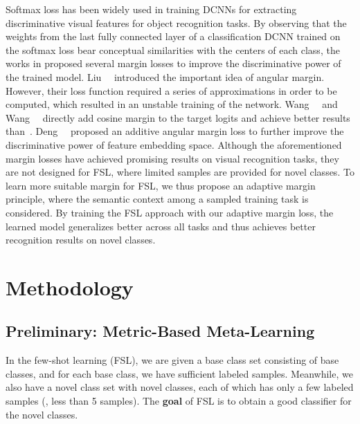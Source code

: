 \documentclass[10pt,twocolumn,letterpaper]{article}
\begin{document}
Softmax loss has been widely used in training DCNNs for extracting discriminative visual features for object recognition tasks. By observing that the weights from the last fully connected layer of a classification DCNN trained on the softmax loss bear conceptual similarities with the centers of each class, the works in \cite{Deng2019cvpr,Wang2018cvprCosface,Liu2017cvprsphere} proposed several margin losses to improve the discriminative power of the trained model. Liu~\etal~\cite{Liu2017cvprsphere} introduced the important idea of angular margin. However, their loss function required a series of approximations in order to be computed, which resulted in an unstable training of the network. Wang~\etal~\cite{Wang2018iclrws} and Wang~\etal~\cite{Wang2018cvprCosface} directly add cosine margin to the target logits and achieve better results than~\cite{Liu2017cvprsphere}. Deng~\etal~\cite{Deng2019cvpr} proposed an additive angular margin loss to further improve the discriminative power of feature embedding space. Although the aforementioned margin losses have achieved promising results on visual recognition tasks, they are not designed for FSL, where limited samples are provided for novel classes. To learn more suitable margin for FSL, we thus propose an adaptive margin principle, where the semantic context among a sampled training task is considered. By training the FSL approach with our adaptive margin loss, the learned model generalizes better across all tasks and thus achieves better recognition results on novel classes.

\section{Methodology}

\subsection{Preliminary: Metric-Based Meta-Learning}

In the few-shot learning (FSL), we are given a base class set  consisting of  base classes, and for each base class, we have sufficient labeled samples.
Meanwhile, we also have a novel class set  with  novel classes, each of which has only a few labeled
samples (\eg, less than 5 samples).
The {\bf goal} of FSL is to obtain a good classifier for the novel classes. 
\end{document}
